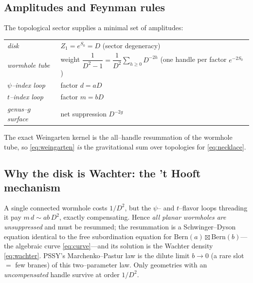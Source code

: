 \documentclass[11pt]{article}
\newcommand{\Bern}{\mathrm{Bern}}
\newcommand{\eS}{e^{S_0}}
\begin{document}
\subsection{Amplitudes and Feynman rules}
The topological sector supplies a minimal set of amplitudes:
\begin{center}
\begin{tabular}{ll}
\emph{disk} & $Z_1=\eS=D$ \quad(sector degeneracy)\\[2pt]
\emph{wormhole tube} & weight $\dfrac{1}{D^2-1}=\dfrac{1}{D^2}\displaystyle\sum_{h\ge0}D^{-2h}$
\quad(one handle per factor $e^{-2S_0}$)\\[8pt]
\emph{$\psi$--index loop} & factor $d=aD$\\[2pt]
\emph{$t$--index loop} & factor $m=bD$\\[2pt]
\emph{genus--$g$ surface} & net suppression $D^{-2g}$
\end{tabular}
\end{center}
The exact Weingarten kernel is the all--handle resummation of the wormhole tube, so
\eqref{eq:weingarten} \emph{is} the gravitational sum over topologies for \eqref{eq:necklace}.

\subsection{Why the disk is Wachter: the 't Hooft mechanism}
A single connected wormhole costs $1/D^2$, but the $\psi$-- and $t$--flavor loops threading it pay
$m\,d\sim ab\,D^2$, exactly compensating. Hence \emph{all planar wormholes are unsuppressed} and
must be resummed; the resummation is a Schwinger--Dyson equation identical to the free
subordination equation for $\Bern(a)\boxtimes\Bern(b)$---the algebraic curve \eqref{eq:curve}---and
its solution is the Wachter density \eqref{eq:wachter}. PSSY's Marchenko--Pastur law is the dilute
limit $b\to0$ (a rare slot $=$ few branes) of this two--parameter law. Only geometries with an
\emph{uncompensated} handle survive at order $1/D^2$.
\end{document}
